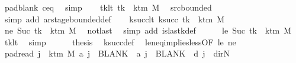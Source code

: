 \begin{isabellebody}
\ pad{\isacharunderscore}{\kern0pt}blank\ c{\isacharprime}{\kern0pt}{\isacharunderscore}{\kern0pt}eq\ \isamarkupfalse%
\ simp\isanewline
\ \ \isamarkupfalse%
\ tk{\isacharunderscore}{\kern0pt}lt{\isacharcolon}{\kern0pt}\ {\isachardoublequoteopen}tk\ {\isacharless}{\kern0pt}\ k{\isacharunderscore}{\kern0pt}tm\ M{\isachardoublequoteclose}\ \isamarkupfalse%
\ src{\isacharunderscore}{\kern0pt}bounded\ \isamarkupfalse%
\ {\isacharparenleft}{\kern0pt}simp\ add{\isacharcolon}{\kern0pt}\ ar{\isacharunderscore}{\kern0pt}stage{\isacharunderscore}{\kern0pt}bounded{\isacharunderscore}{\kern0pt}def{\isacharparenright}{\kern0pt}\isanewline
\ \ \isamarkupfalse%
\ ksucc{\isacharunderscore}{\kern0pt}lt{\isacharcolon}{\kern0pt}\ {\isachardoublequoteopen}k{\isacharunderscore}{\kern0pt}succ\ tk\ {\isacharless}{\kern0pt}\ k{\isacharunderscore}{\kern0pt}tm\ M{\isachardoublequoteclose}\isanewline
\ \ \isamarkupfalse%
\ {\isacharminus}{\kern0pt}\isanewline
\ \ \ \ \isamarkupfalse%
\ ne{\isacharcolon}{\kern0pt}\ {\isachardoublequoteopen}Suc\ tk\ {\isasymnoteq}\ k{\isacharunderscore}{\kern0pt}tm\ M{\isachardoublequoteclose}\ \isamarkupfalse%
\ notlast\ \isamarkupfalse%
\ {\isacharparenleft}{\kern0pt}simp\ add{\isacharcolon}{\kern0pt}\ is{\isacharunderscore}{\kern0pt}last{\isacharunderscore}{\kern0pt}k{\isacharunderscore}{\kern0pt}def{\isacharparenright}{\kern0pt}\isanewline
\ \ \ \ \isamarkupfalse%
\ le{\isacharcolon}{\kern0pt}\ {\isachardoublequoteopen}Suc\ tk\ {\isasymle}\ k{\isacharunderscore}{\kern0pt}tm\ M{\isachardoublequoteclose}\ \isamarkupfalse%
\ tk{\isacharunderscore}{\kern0pt}lt\ \isamarkupfalse%
\ simp\isanewline
\ \ \ \ \isamarkupfalse%
\ {\isacharquery}{\kern0pt}thesis\ \isamarkupfalse%
\ k{\isacharunderscore}{\kern0pt}succ{\isacharunderscore}{\kern0pt}def\ \isamarkupfalse%
\ le{\isacharunderscore}{\kern0pt}neq{\isacharunderscore}{\kern0pt}implies{\isacharunderscore}{\kern0pt}less{\isacharbrackleft}{\kern0pt}OF\ le\ ne{\isacharbrackright}{\kern0pt}\ \isakeywordONE{{\isachardot}{\kern0pt}}\isamarkupfalse%
\isanewline
\ \ \isamarkupfalse%
\isanewline
\ \ \isamarkupfalse%
\ pad{\isacharunderscore}{\kern0pt}read{\isacharcolon}{\kern0pt}\ {\isachardoublequoteopen}{\isasymforall}j\ {\isasymge}\ k{\isacharunderscore}{\kern0pt}tm\ M{\isachardot}{\kern0pt}\ {\isacharquery}{\kern0pt}a\ j\ {\isacharequal}{\kern0pt}\ BLANK{}\ {\isasymand}\ {\isacharquery}{\kern0pt}a\ j\ {\isacharequal}{\kern0pt}\ BLANK{}\ {\isasymand}\ {\isacharquery}{\kern0pt}d\ j\ {\isacharequal}{\kern0pt}\ dir{\isachardot}{\kern0pt}N{\isachardoublequoteclose}\isanewline

\end{isabellebody}
